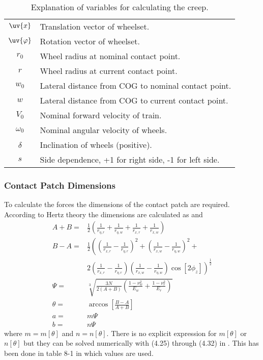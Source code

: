 \begin{table}[htpb!]
 \centering
 \caption{Explanation of variables for calculating the creep.}
 \begin{tabular}{c | l}
  $\uv{x}$       & Translation vector of wheelset.\\
  $\uv{\varphi}$ & Rotation vector of wheelset.\\
  $r_0$		 & Wheel radius at nominal contact point.\\
  $r$            & Wheel radius at current contact point.\\
  $w_0$		 & Lateral distance from COG to nominal contact point.\\
  $w$		 & Lateral distance from COG to current contact point.\\
  $V_0$		 & Nominal forward velocity of train.\\
  $\omega_0$	 & Nominal angular velocity of wheels.\\
  $\delta$	 & Inclination of wheels (positive).\\
  $s$		 & Side dependence, +1 for right side, -1 for left side.
 \end{tabular}
\end{table}

\subsubsection{Contact Patch Dimensions}
To calculate the forces the dimensions of the contact patch are required.
According to Hertz theory the dimensions are calculated as \cite{hallfasthetslara_bsundstrom} and \cite{railvehicledynamics_eandersson}
\begin{align}
 A+B    =& \frac12 \left(\frac{1}{r_{\eta,r}}+\frac{1}{r_{\eta,w}}+\frac{1}{r_{x,r}}+\frac{1}{r_{x,w}} \right)\\
 \nonumber B-A =& \frac12 \left(\left(\frac{1}{r_{x,r}}-\frac{1}{r_{\eta,r}}\right)^2 + 
                          \left(\frac{1}{r_{x,w}}-\frac{1}{r_{\eta,w}}\right)^2 +\right.\\
               &\left.   2\left(\frac{1}{r_{x,r}}-\frac{1}{r_{\eta,r}}\right)
                          \left(\frac{1}{r_{x,w}}-\frac{1}{r_{\eta,w}}\right)\cos[2\phi_z]\right)^\frac12\\
 \Psi   =& \sqrt[3]{\frac{3 N}{2 (A+B)} \left(\frac{1-\nu_w^2}{E_w} +\frac{1-\nu_r^2}{E_r}\right)}\\ 
 \theta =& \arccos\left[\frac{B-A}{A+B}\right]\\
 a      =& m \Psi\\
 b      =& n \Psi
\end{align}
where $m = m[\theta]$ and $n = n[\theta]$. There is no explicit expression for $m[\theta]$ or $n[\theta]$ but they can be solved numerically with (4.25) through (4.32) in \cite{contact_mechanics_kljohnson}. This has been done in table 8-1 in \cite{railvehicledynamics_eandersson} which values are used.

